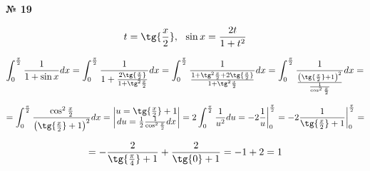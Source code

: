 \documentclass{article}
\begin{document}
\textbf{№ 19} 
\Large

$$ t = \tg{\frac{x}{2}}, \ \ \sin{x} = \frac{2t}{1+t^2}$$

$$ \int_{0}^{\frac{\pi}{2}} \frac{1}{1+\sin{x}} dx 
= \int_{0}^{\frac{\pi}{2}} \frac{1}{1+\frac{2\tg{\frac{x}{2}}}{1+\tg^2{\frac{x}{2}}}} dx
= \int_{0}^{\frac{\pi}{2}} \frac{1}{\frac{1 + \tg^2{\frac{x}{2}} + 2\tg{\frac{x}{2}}}{1+\tg^2{\frac{x}{2}}}} dx
= \int_{0}^{\frac{\pi}{2}} \frac{1}{\frac{\left( \tg{\frac{x}{2}} + 1 \right)^2}{\frac{1}{\cos^2{\frac{x}{2}}}}} dx
= $$

$$ = \int_{0}^{\frac{\pi}{2}} \frac{\cos^2{\frac{x}{2}}}{\left( \tg{\frac{x}{2}} + 1 \right)^2} dx
= \begin{vmatrix} u = \tg{\frac{x}{2}} + 1 \\
                 du = \frac{1}{2} \frac{1}{\cos^2{\frac{x}{2}}}dx \end{vmatrix}
= 2\int_{0}^{\frac{\pi}{2}} \frac{1}{u^2}du
= -2 \frac{1}{u} \bigg\vert_{0}^{\frac{\pi}{2}} 
= -2 \frac{1}{\tg{\frac{x}{2}} + 1} \bigg\vert_{0}^{\frac{\pi}{2}}
= $$

$$ = -\frac{2}{\tg{\frac{\pi}{4}}+1} + \frac{2}{\tg{0}+1}
= -1 + 2
= 1 $$
\end{document}
